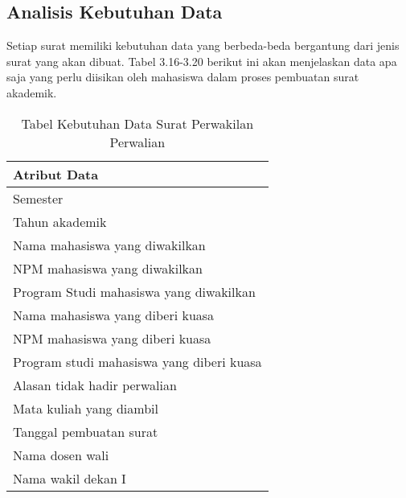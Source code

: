 \subsection{Analisis Kebutuhan Data}
\label{sec:analisis_kebutuhan_data}
Setiap surat memiliki kebutuhan data yang berbeda-beda bergantung dari jenis surat yang akan dibuat. Tabel 3.16-3.20 berikut ini akan menjelaskan data apa saja yang perlu diisikan oleh mahasiswa dalam proses pembuatan surat akademik.\
\begin{table}[H]
\centering
\caption{Tabel Kebutuhan Data Surat Perwakilan Perwalian}
\label{surat_perwakilan_perwalian}
\begin{tabular}{|l|}
\hline
\textbf{Atribut Data}                     \\ \hline
Semester            											\\ \hline
Tahun akademik								            \\ \hline
Nama mahasiswa yang diwakilkan            \\ \hline 
NPM mahasiswa yang diwakilkan             \\ \hline 
Program Studi mahasiswa yang diwakilkan   \\ \hline 
Nama mahasiswa yang diberi kuasa          \\ \hline 
NPM mahasiswa yang diberi kuasa           \\ \hline 
Program studi mahasiswa yang diberi kuasa \\ \hline 
Alasan tidak hadir perwalian               \\ \hline 
Mata kuliah yang diambil                  \\ \hline 
Tanggal pembuatan surat                   \\ \hline
Nama dosen wali								            \\ \hline
Nama wakil dekan I								        \\ \hline
\end{tabular}
\end{table}

